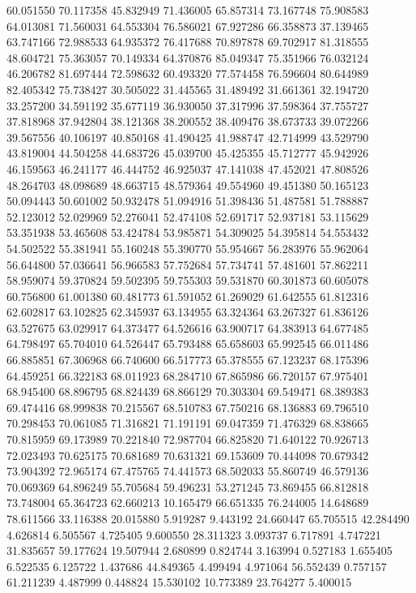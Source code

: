 60.051550
70.117358
45.832949
71.436005
65.857314
73.167748
75.908583
64.013081
71.560031
64.553304
76.586021
67.927286
66.358873
37.139465
63.747166
72.988533
64.935372
76.417688
70.897878
69.702917
81.318555
48.604721
75.363057
70.149334
64.370876
85.049347
75.351966
76.032124
46.206782
81.697444
72.598632
60.493320
77.574458
76.596604
80.644989
82.405342
75.738427
30.505022
31.445565
31.489492
31.661361
32.194720
33.257200
34.591192
35.677119
36.930050
37.317996
37.598364
37.755727
37.818968
37.942804
38.121368
38.200552
38.409476
38.673733
39.072266
39.567556
40.106197
40.850168
41.490425
41.988747
42.714999
43.529790
43.819004
44.504258
44.683726
45.039700
45.425355
45.712777
45.942926
46.159563
46.241177
46.444752
46.925037
47.141038
47.452021
47.808526
48.264703
48.098689
48.663715
48.579364
49.554960
49.451380
50.165123
50.094443
50.601002
50.932478
51.094916
51.398436
51.487581
51.788887
52.123012
52.029969
52.276041
52.474108
52.691717
52.937181
53.115629
53.351938
53.465608
53.424784
53.985871
54.309025
54.395814
54.553432
54.502522
55.381941
55.160248
55.390770
55.954667
56.283976
55.962064
56.644800
57.036641
56.966583
57.752684
57.734741
57.481601
57.862211
58.959074
59.370824
59.502395
59.755303
59.531870
60.301873
60.605078
60.756800
61.001380
60.481773
61.591052
61.269029
61.642555
61.812316
62.602817
63.102825
62.345937
63.134955
63.324364
63.267327
61.836126
63.527675
63.029917
64.373477
64.526616
63.900717
64.383913
64.677485
64.798497
65.704010
64.526447
65.793488
65.658603
65.992545
66.011486
66.885851
67.306968
66.740600
66.517773
65.378555
67.123237
68.175396
64.459251
66.322183
68.011923
68.284710
67.865986
66.720157
67.975401
68.945400
68.896795
68.824439
68.866129
70.303304
69.549471
68.389383
69.474416
68.999838
70.215567
68.510783
67.750216
68.136883
69.796510
70.298453
70.061085
71.316821
71.191191
69.047359
71.476329
68.838665
70.815959
69.173989
70.221840
72.987704
66.825820
71.640122
70.926713
72.023493
70.625175
70.681689
70.631321
69.153609
70.444098
70.679342
73.904392
72.965174
67.475765
74.441573
68.502033
55.860749
46.579136
70.069369
64.896249
55.705684
59.496231
53.271245
73.869455
66.812818
73.748004
65.364723
62.660213
10.165479
66.651335
76.244005
14.648689
78.611566
33.116388
20.015880
5.919287
9.443192
24.660447
65.705515
42.284490
4.626814
6.505567
4.725405
9.600550
28.311323
3.093737
6.717891
4.747221
31.835657
59.177624
19.507944
2.680899
0.824744
3.163994
0.527183
1.655405
6.522535
6.125722
1.437686
44.849365
4.499494
4.971064
56.552439
0.757157
61.211239
4.487999
0.448824
15.530102
10.773389
23.764277
5.400015
